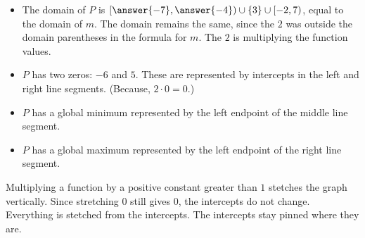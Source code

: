 \documentclass{ximera}
\begin{document}
\begin{example}
\begin{image}
\end{image}




\begin{itemize}

\item The domain of $P$ is $\left[\answer{-7},\answer{-4}\right) \cup \{3\} \cup [-2,7)$, equal to the domain of $m$. The domain remains the same, since the $2$ was outside the domain parentheses in the formula for $m$. The $2$ is multiplying the function values.
\item $P$ has two zeros: $-6$ and $5$. These are represented by intercepts in the left and right line segments. (Because, $2 \cdot 0 = 0$.) \\
\item $P$ has a global minimum represented by the left endpoint of the middle line segment. \\
\item $P$ has a global maximum represented by the left endpoint of the right line segment.

\end{itemize}


\end{example}


Multiplying a function by a positive constant greater than $1$ stetches the graph vertically.  Since stretching $0$ still gives $0$, the intercepts do not change.  Everything is stetched from the intercepts. The intercepts stay pinned where they are.
\end{document}
